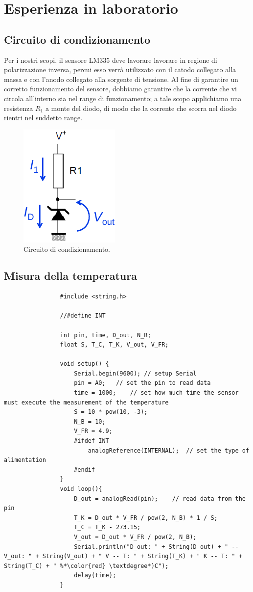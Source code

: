 \documentclass[a4paper]{article}
\begin{document}
	\section{Esperienza in laboratorio}
		\subsection{Circuito di condizionamento}
			Per i nostri scopi, il sensore LM335 deve lavorare lavorare in regione di polarizzazione inversa, percui esso verrà utilizzato con il catodo collegato alla massa e con l'anodo collegato alla sorgente di tensione.
			\newline
			Al fine di garantire un corretto funzionamento del sensore, dobbiamo garantire che la corrente che vi circola all'interno sia nel range di funzionamento; a tale scopo applichiamo una resistenza $ R_{1} $ a monte del diodo, di modo che la corrente che scorra nel diodo rientri nel suddetto range.
			\begin{figure}[h!]
				\centering
				\includegraphics[scale=0.5]{circuitoDiCondizionamento}
				\caption{Circuito di condizionamento.}
				\label{fig:circuitoDiCondizionamento}
			\end{figure}
		\subsection{Misura della temperatura}
			\begin{lstlisting}
				#include <string.h>
				
				//#define INT
				
				int pin, time, D_out, N_B;
				float S, T_C, T_K, V_out, V_FR;
				
				void setup() {
					Serial.begin(9600);	// setup Serial
					pin = A0;	// set the pin to read data
					time = 1000;	// set how much time the sensor must execute the measurement of the temperature
					S = 10 * pow(10, -3);
					N_B = 10;
					V_FR = 4.9;
					#ifdef INT
						analogReference(INTERNAL);	// set the type of alimentation
					#endif
				}
				void loop(){
					D_out = analogRead(pin);	// read data from the pin
					T_K = D_out * V_FR / pow(2, N_B) * 1 / S;
					T_C = T_K - 273.15;
					V_out = D_out * V_FR / pow(2, N_B);
					Serial.println("D_out: " + String(D_out) + " -- V_out: " + String(V_out) + " V -- T: " + String(T_K) + " K -- T: " + String(T_C) + " %*\color{red} \textdegree*)C");
					delay(time);
				}
			\end{lstlisting}
\end{document}
